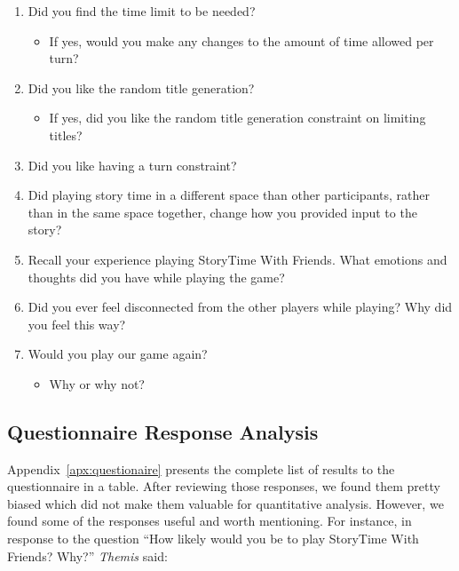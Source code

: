 \documentclass{sigchi}
\begin{document}
\begin{enumerate}[leftmargin=.5in, noitemsep]
    \item Did you find the time limit to be needed?
        \begin{itemize}[noitemsep]
            \item If yes, would you make any changes to the amount of time allowed per turn?
        \end{itemize}    
        
    \item Did you like the random title generation?
        \begin{itemize}[noitemsep]
            \item If yes, did you like the random title generation constraint on limiting titles?
        \end{itemize}
        
    \item Did you like having a turn constraint?
    
    \item Did playing story time in a different space than other participants, rather than in the same space together, change how you provided input to the story?
    
    \item Recall your experience playing StoryTime With Friends. What emotions and thoughts did you have while playing the game?
    
    \item Did you ever feel disconnected from the other players while playing? Why did you feel this way?
    
    \item Would you play our game again?
        \begin{itemize}[noitemsep]
            \item Why or why not?
        \end{itemize}
    
\end{enumerate}

\subsection{Questionnaire Response Analysis}
Appendix~\ref{apx:questionaire} presents the complete list of results to the questionnaire in a table. After reviewing those responses, we found them pretty biased which did not make them valuable for quantitative analysis. However, we found some of the responses useful and worth mentioning. For instance, in response to the question ``How likely would you be to play StoryTime With Friends? Why?'' \textit{Themis} said:
\end{document}
